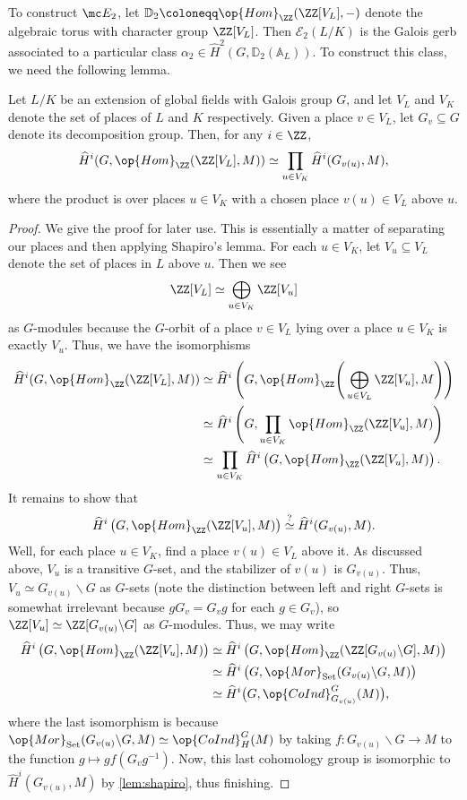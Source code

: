 To construct $\mc E_2$, let $\mathbb D_2\coloneqq\op{Hom}_\ZZ(\ZZ[V_L],-)$ denote the algebraic torus with character group $\ZZ[V_L]$. Then $\mathcal E_2(L/K)$ is the Galois gerb associated to a particular class $\alpha_2\in\widehat H^2\left(G,\mathbb D_2(\mathbb A_L)\right)$. To construct this class, we need the following lemma.
\begin{lemma} \label{lem:magicaltate}
	Let $L/K$ be an extension of global fields with Galois group $G$, and let $V_L$ and $V_K$ denote the set of places of $L$ and $K$ respectively. Given a place $v\in V_L$, let $G_v\subseteq G$ denote its decomposition group. Then, for any $i\in\ZZ$,
	\[\widehat H^i(G,\op{Hom}_\ZZ(\ZZ[V_L],M))\simeq\prod_{u\in V_K}\widehat H^i(G_{v(u)},M),\]
	where the product is over places $u\in V_K$ with a chosen place $v(u)\in V_L$ above $u$.
\end{lemma}
\begin{proof}
	We give the proof for later use. This is essentially a matter of separating our places and then applying Shapiro's lemma. For each $u\in V_K$, let $V_{u}\subseteq V_L$ denote the set of places in $L$ above $u$. Then we see
	\[\ZZ[V_L]\simeq\bigoplus_{u\in V_K}\ZZ[V_u]\]
	as $G$-modules because the $G$-orbit of a place $v\in V_L$ lying over a place $u\in V_K$ is exactly $V_u$. Thus, we have the isomorphisms
	\begin{align*}
		\widehat H^i(G,\op{Hom}_\ZZ(\ZZ[V_L],M)) &\simeq \widehat H^i\left(G,\op{Hom}_\ZZ\Bigg(\bigoplus_{u\in V_L}\ZZ[V_u],M\Bigg)\right) \\
		&\simeq \widehat H^i\left(G,\prod_{u\in V_K}\op{Hom}_\ZZ(\ZZ[V_u],M)\right) \\
		&\simeq \prod_{u\in V_K}\widehat H^i\left(G,\op{Hom}_\ZZ(\ZZ[V_u],M)\right).
	\end{align*}
	It remains to show that
	\[\widehat H^i\left(G,\op{Hom}_\ZZ(\ZZ[V_u],M)\right)\stackrel?\simeq\widehat H^i(G_{v(u)},M).\]
	Well, for each place $u\in V_K$, find a place $v(u)\in V_L$ above it. As discussed above, $V_u$ is a transitive $G$-set, and the stabilizer of $v(u)$ is $G_{v(u)}$. Thus, $V_u\simeq G_{v(u)}\backslash G$ as $G$-sets (note the distinction between left and right $G$-sets is somewhat irrelevant because $gG_v=G_vg$ for each $g\in G_v$), so $\ZZ[V_u]\simeq\ZZ[G_{v(u)}\backslash G]$ as $G$-modules. Thus, we may write
	\begin{align*}
		\widehat H^i\left(G,\op{Hom}_\ZZ(\ZZ[V_u],M)\right) &\simeq \widehat H^i\left(G,\op{Hom}_\ZZ(\ZZ[G_{v(u)}\backslash G],M)\right) \\
		&\simeq \widehat H^i\left(G,\op{Mor}_{\mathrm{Set}}(G_{v(u)}\backslash G,M)\right) \\
		&\simeq \widehat H^i\big(G,\op{CoInd}_{G_{v(u)}}^G(M)\big),
	\end{align*}
	where the last isomorphism is because $\op{Mor}_{\mathrm{Set}}(G_{v(u)}\backslash G,M)\simeq\op{CoInd}_H^G(M)$ by taking $f\colon G_{v(u)}\backslash G\to M$ to the function $g\mapsto gf\left(G_vg^{-1}\right)$. Now, this last cohomology group is isomorphic to $\widehat H^i(G_{v(u)},M)$ by \autoref{lem:shapiro}, thus finishing.
\end{proof}
